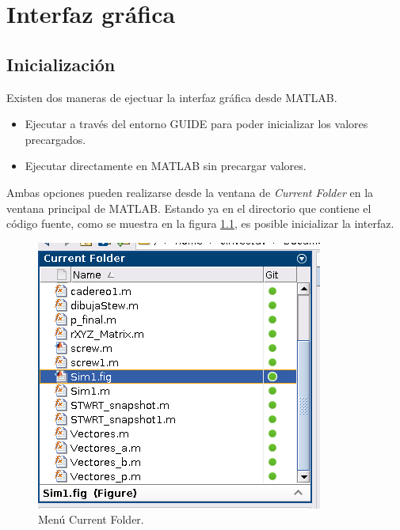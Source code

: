 \chapter{Interfaz gráfica}

% 

\section{Inicialización}

Existen dos maneras de ejectuar 
la interfaz gráfica desde MATLAB.
\begin{itemize}
 \item Ejecutar a través del entorno GUIDE para poder
 inicializar los valores precargados.
 \item Ejecutar directamente en MATLAB 
 sin precargar valores.
\end{itemize}

Ambas opciones pueden realizarse desde la ventana de 
\emph{Current Folder} en la ventana principal de MATLAB.
Estando ya en el directorio que contiene el código fuente,
como se muestra en la figura \ref{fig: start GUI}, 
es posible inicializar la interfaz.

\begin{figure}[h!]
 \centering
 \includegraphics[scale=0.6]{img/GUI_start_click.PNG}
 \caption{Menú Current Folder.}
 \label{fig: start GUI}
\end{figure}



